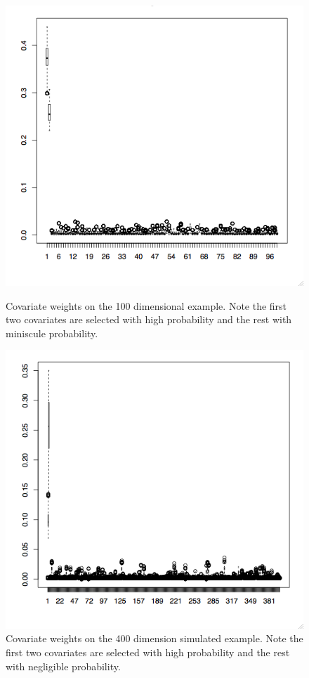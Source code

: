 \begin{figure}[h]
\centering
\label{fig:3fig_tree}
\centering
  \includegraphics[scale=0.4]{figures/weight_simulated_example_USE1.png}
  \caption[Covariate inclusion probabilities for the 100 covariate example.]{Covariate weights on the 100 dimensional example. Note the first two covariates are selected with high probability and the rest with miniscule probability.}\label{fig:awesome_image5}
\endminipage\hfill
{}
\hspace{-1cm}
  \includegraphics[scale=0.4]{figures/my_method1.png}
  \caption[Covariate inclusion probabilities for the 400 covariate example.]{Covariate weights on the 400 dimension simulated example. Note the first two covariates are selected with high probability and the rest with negligible probability.}\label{fig:awesome_image6}
\endminipage\hfill
\end{figure}

